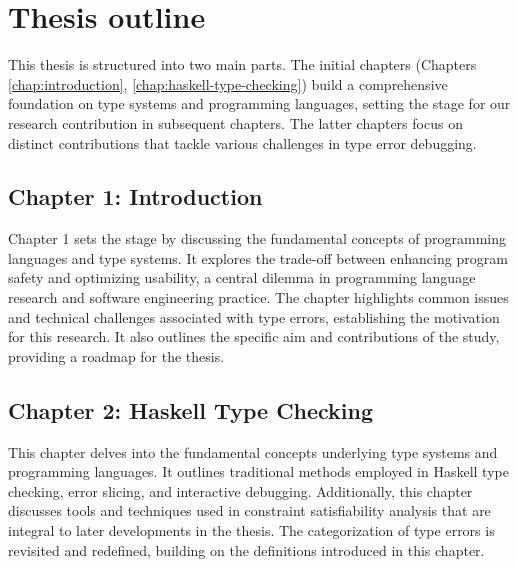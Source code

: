 



\section{Thesis outline}

 This thesis is structured into two main parts. The initial chapters (Chapters \ref{chap:introduction}, \ref{chap:haskell-type-checking}) build a comprehensive foundation on type systems and programming languages, setting the stage for our research contribution in subsequent chapters. The latter chapters focus on distinct contributions that tackle various challenges in type error debugging.

\subsection{Chapter 1: Introduction}
Chapter 1 sets the stage by discussing the fundamental concepts of programming languages and type systems. It explores the trade-off between enhancing program safety and optimizing usability, a central dilemma in programming language research and software engineering practice. The chapter highlights common issues and technical challenges associated with type errors, establishing the motivation for this research. It also outlines the specific aim and contributions of the study, providing a roadmap for the thesis.

\subsection{Chapter 2: Haskell Type Checking}
This chapter delves into the fundamental concepts underlying type systems and programming languages. It outlines traditional methods employed in Haskell type checking, error slicing, and interactive debugging. Additionally, this chapter discusses tools and techniques used in constraint satisfiability analysis that are integral to later developments in the thesis. The categorization of type errors is revisited and redefined, building on the definitions introduced in this chapter.
    
